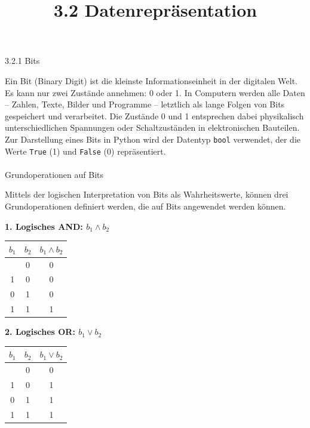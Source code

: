 \documentclass[
  11pt,
  a4paper,
  DIV=11,
  numbers=noendperiod]{scrartcl}
\title{3.2 Datenrepräsentation}
\author{}
\date{}
\makeatletter
\let\oldparagraph\paragraph
\renewcommand{\paragraph}{
    \@ifstar
      \xxxParagraphStar
      \xxxParagraphNoStar
  }
\newcommand{\xxxParagraphStar}[1]{\oldparagraph*{#1}\mbox{}}
\newcommand{\xxxParagraphNoStar}[1]{\oldparagraph{#1}\mbox{}}
\makeatother
\begin{document}
\maketitle


\paragraph{3.2.1 Bits}\label{bits}

Ein Bit (Binary Digit) ist die kleinste Informationseinheit in der
digitalen Welt. Es kann nur zwei Zustände annehmen: 0 oder 1. In
Computern werden alle Daten -- Zahlen, Texte, Bilder und Programme --
letztlich als lange Folgen von Bits gespeichert und verarbeitet. Die
Zustände 0 und 1 entsprechen dabei physikalisch unterschiedlichen
Spannungen oder Schaltzuständen in elektronischen Bauteilen. Zur
Darstellung eines Bits in Python wird der Datentyp \texttt{bool}
verwendet, der die Werte \texttt{True} (1) und \texttt{False} (0)
repräsentiert.

\paragraph{Grundoperationen auf Bits}\label{grundoperationen-auf-bits}

Mittels der logischen Interpretation von Bits als Wahrheitswerte, können
drei Grundoperationen definiert werden, die auf Bits angewendet werden
können.

\textbf{1. Logisches AND: \(b_1 \land b_2\)}

\begin{longtable}[]{@{}ccc@{}}
\toprule\noalign{}
\(b_1\) & \(b_2\) & \(b_1 \land b_2\) \\
\midrule\noalign{}
\endhead
\bottomrule\noalign{}
\endlastfoot
0 & 0 & 0 \\
1 & 0 & 0 \\
0 & 1 & 0 \\
1 & 1 & 1 \\
\end{longtable}

\textbf{2. Logisches OR: \(b_1 \lor b_2\)}

\begin{longtable}[]{@{}ccc@{}}
\toprule\noalign{}
\(b_1\) & \(b_2\) & \(b_1 \lor b_2\) \\
\midrule\noalign{}
\endhead
\bottomrule\noalign{}
\endlastfoot
0 & 0 & 0 \\
1 & 0 & 1 \\
0 & 1 & 1 \\
1 & 1 & 1 \\
\end{longtable}
\end{document}

